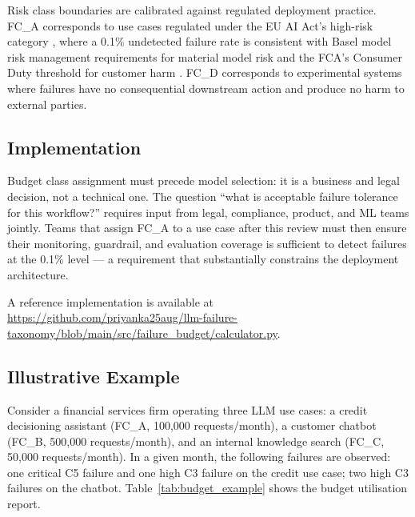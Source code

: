 \documentclass{article}
\begin{document}
Risk class boundaries are calibrated against regulated deployment practice.
FC\_A corresponds to use cases regulated under the EU AI Act's high-risk
category \citep{euaiact2024}, where a 0.1\% undetected failure rate is
consistent with Basel model risk management requirements for material model
risk \citep{dora2022} and the FCA's Consumer Duty threshold for customer harm
\citep{fcaconsumerduty2024}.  FC\_D corresponds to experimental systems where
failures have no consequential downstream action and produce no harm to
external parties.

\subsection{Implementation}

Budget class assignment must precede model selection: it is a business and
legal decision, not a technical one.  The question ``what is acceptable failure
tolerance for this workflow?'' requires input from legal, compliance, product,
and ML teams jointly.  Teams that assign FC\_A to a use case after this review
must then ensure their monitoring, guardrail, and evaluation coverage is
sufficient to detect failures at the 0.1\% level --- a requirement that
substantially constrains the deployment architecture.

A reference implementation is available at
\url{https://github.com/priyanka25aug/llm-failure-taxonomy/blob/main/src/failure_budget/calculator.py}.

\subsection{Illustrative Example}

Consider a financial services firm operating three LLM use cases: a credit
decisioning assistant (FC\_A, 100{,}000 requests/month), a customer chatbot
(FC\_B, 500{,}000 requests/month), and an internal knowledge search (FC\_C,
50{,}000 requests/month).  In a given month, the following failures are
observed: one critical C5 failure and one high C3 failure on the credit use
case; two high C3 failures on the chatbot.  Table~\ref{tab:budget_example}
shows the budget utilisation report.

\begin{table}[t]
\caption{Failure budget utilisation example.  One critical C5 and one high C3
on a Decision-Critical use case puts it in WARNING status.}
\label{tab:budget_example}
\centering
\small
{}
\end{table}
\end{document}
